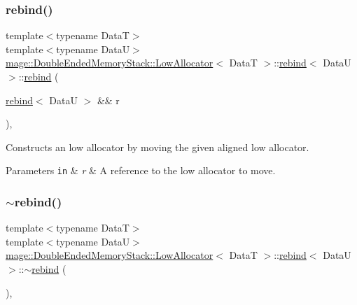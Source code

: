 \subsubsection{\texorpdfstring{rebind()}{rebind()}\hspace{0.1cm}{\footnotesize\ttfamily [3/3]}}
{\footnotesize\ttfamily template$<$typename DataT$>$ \\
template$<$typename DataU$>$ \\
\hyperlink{structmage_1_1_double_ended_memory_stack_1_1_low_allocator}{mage\+::\+Double\+Ended\+Memory\+Stack\+::\+Low\+Allocator}$<$ DataT $>$\+::\hyperlink{structmage_1_1_double_ended_memory_stack_1_1_low_allocator_1_1rebind}{rebind}$<$ DataU $>$\+::\hyperlink{structmage_1_1_double_ended_memory_stack_1_1_low_allocator_1_1rebind}{rebind} (\begin{DoxyParamCaption}\item[{\hyperlink{structmage_1_1_double_ended_memory_stack_1_1_low_allocator_1_1rebind}{rebind}$<$ DataU $>$ \&\&}]{r }\end{DoxyParamCaption})\hspace{0.3cm}{\ttfamily [private]}, {\ttfamily [delete]}}

Constructs an low allocator by moving the given aligned low allocator.


\begin{DoxyParams}[1]{Parameters}
\mbox{\tt in}  & {\em r} & A reference to the low allocator to move. \\
\hline
\end{DoxyParams}
\hypertarget{structmage_1_1_double_ended_memory_stack_1_1_low_allocator_1_1rebind_a54b1fa630e8a021ced000f950748f707}{}\label{structmage_1_1_double_ended_memory_stack_1_1_low_allocator_1_1rebind_a54b1fa630e8a021ced000f950748f707} 
\subsubsection{\texorpdfstring{$\sim$rebind()}{~rebind()}}
{\footnotesize\ttfamily template$<$typename DataT$>$ \\
template$<$typename DataU$>$ \\
\hyperlink{structmage_1_1_double_ended_memory_stack_1_1_low_allocator}{mage\+::\+Double\+Ended\+Memory\+Stack\+::\+Low\+Allocator}$<$ DataT $>$\+::\hyperlink{structmage_1_1_double_ended_memory_stack_1_1_low_allocator_1_1rebind}{rebind}$<$ DataU $>$\+::$\sim$\hyperlink{structmage_1_1_double_ended_memory_stack_1_1_low_allocator_1_1rebind}{rebind} (\begin{DoxyParamCaption}{ }\end{DoxyParamCaption})\hspace{0.3cm}{\ttfamily [private]}, {\ttfamily [delete]}}

